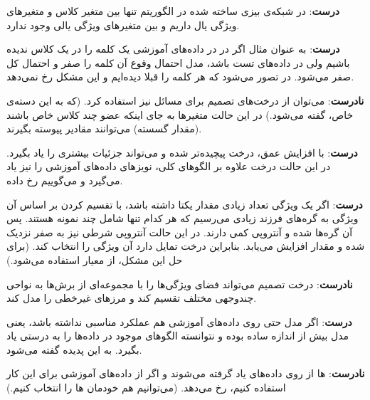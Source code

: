 \question{}

\begin{ابجد}
\item \textbf{درست}: در شبکه‌ی بیزی ساخته شده در الگوریتم  تنها بین متغیر کلاس و متغیرهای ویژگی یال داریم و بین متغیرهای ویژگی یالی وجود ندارد.

\item \textbf{درست}: به عنوان مثال اگر در  در داده‌های آموزشی یک کلمه را در یک کلاس ندیده باشیم ولی در داده‌های تست باشد، مدل احتمال وقوع آن کلمه را صفر و احتمال کل صفر می‌شود. در  تصور می‌شود که هر کلمه را قبلا دیده‌ایم و این مشکل رخ نمی‌دهد.

\item \textbf{نادرست}: می‌توان از درخت‌های تصمیم برای مسائل  نیز استفاده کرد. (که به این دسته‌ی خاص،  گفته می‌شود.) در این حالت متغیرها به جای اینکه عضو چند کلاس خاص باشند (مقدار گسسته) می‌توانند مقادیر پیوسته بگیرند.

\item \textbf{درست}: با افزایش عمق، درخت پیچیده‌تر شده و می‌تواند جزئیات بیشتری را یاد بگیرد. در این حالت درخت علاوه بر الگوهای کلی، نویزهای داده‌های آموزشی را نیز یاد می‌گیرد و می‌گوییم  رخ داده.

\item \textbf{درست}: اگر یک ویژگی تعداد زیادی مقدار یکتا داشته باشد، با تقسیم کردن بر اساس آن ویژگی به گره‌های فرزند زیادی می‌رسیم که هر کدام تنها شامل چند نمونه هستند. پس آن گره‌ها  شده و آنتروپی کمی دارند. در این حالت آنتروپی شرطی نیز به صفر نزدیک شده و مقدار  افزایش می‌یابد. بنابراین درخت تمایل دارد آن ویژگی را انتخاب کند. (برای حل این مشکل، از معیار  استفاده می‌شود.)

\item \textbf{نادرست}: درخت تصمیم می‌تواند فضای ویژگی‌ها را با مجموعه‌ای از برش‌ها به نواحی چندوجهی مختلف تقسیم کند و مرزهای غیرخطی را مدل کند.

\item \textbf{درست}: اگر مدل حتی روی داده‌های آموزشی هم عملکرد مناسبی نداشته باشد، یعنی مدل بیش از اندازه ساده بوده و نتوانسته الگوهای موجود در داده‌ها را به درستی یاد بگیرد. به این پدیده  گفته می‌شود.

\item \textbf{نادرست}:  ها از روی داده‌های  یاد گرفته می‌شوند و اگر از داده‌های آموزشی برای این کار استفاده کنیم،  رخ می‌دهد. (می‌توانیم هم خودمان  ها را انتخاب کنیم.)

\end{ابجد}
